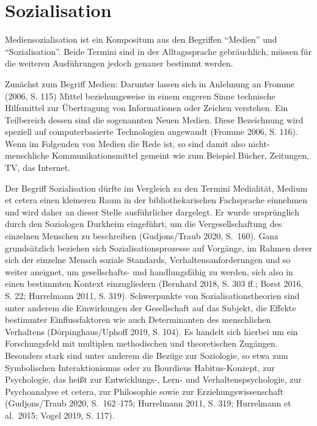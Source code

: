 \documentclass[a4paper,
fontsize=11pt,
oneside,
numbers=noperiodatend,
parskip=half-,
bibliography=totoc,
final
]{scrartcl}
\begin{document}
\hypertarget{sozialisation}{%
\section{Sozialisation}\label{sozialisation}}

Mediensozialisation ist ein Kompositum aus den Begriffen
\enquote{Medien} und \enquote{Sozialisation}. Beide Termini sind in der
Alltagssprache gebräuchlich, müssen für die weiteren Ausführungen jedoch
genauer bestimmt werden.

Zunächst zum Begriff Medien: Darunter lassen sich in Anlehnung an Fromme
(2006, S. 115) Mittel beziehungsweise in einem engeren Sinne technische
Hilfsmittel zur Übertragung von Informationen oder Zeichen verstehen.
Ein Teilbereich dessen sind die sogenannten Neuen Medien. Diese
Bezeichnung wird speziell auf computerbasierte Technologien angewandt
(Fromme 2006, S. 116). Wenn im Folgenden von Medien die Rede ist, so
sind damit also nicht-menschliche Kommunikationsmittel gemeint wie zum
Beispiel Bücher, Zeitungen, TV, das Internet.

Der Begriff Sozialisation dürfte im Vergleich zu den Termini Medialität,
Medium et cetera einen kleineren Raum in der bibliothekarischen
Fachsprache einnehmen und wird daher an dieser Stelle ausführlicher
dargelegt. Er wurde ursprünglich durch den Soziologen Durkheim
eingeführt, um die Vergesellschaftung des einzelnen Menschen zu
beschreiben (Gudjons/Traub 2020, S.~160). Ganz grundsätzlich beziehen
sich Sozialisationsprozesse auf Vorgänge, im Rahmen derer sich der
einzelne Mensch soziale Standards, Verhaltensanforderungen und so weiter
aneignet, um gesellschafts- und handlungsfähig zu werden, sich also in
einen bestimmten Kontext einzugliedern (Bernhard 2018, S. 303 ff.; Borst
2016, S. 22; Hurrelmann 2011, S. 319). Schwerpunkte von
Sozialisationstheorien sind unter anderem die Einwirkungen der
Gesellschaft auf das Subjekt, die Effekte bestimmter Einflussfaktoren
wie auch Determinanten des menschlichen Verhaltens (Dörpinghaus/Uphoff
2019, S. 104). Es handelt sich hierbei um ein Forschungsfeld mit
multiplen methodischen und theoretischen Zugängen. Besonders stark sind
unter anderem die Bezüge zur Soziologie, so etwa zum Symbolischen
Interaktionismus oder zu Bourdieus Habitus-Konzept, zur Psychologie, das
heißt zur Entwicklungs-, Lern- und Verhaltenspsychologie, zur
Psychoanalyse et cetera, zur Philosophie sowie zur
Erziehungswissenschaft (Gudjons/Traub 2020, S.~162--175; Hurrelmann
2011, S. 319; Hurrelmann et al.~2015; Vogel 2019, S. 117).
\end{document}
